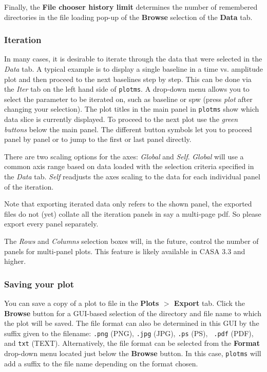 Finally, the {\bf File chooser history limit} determines the number of
remembered directories in the file loading pop-up of the {\bf Browse}
selection of the {\bf Data} tab.


\subsubsection{Iteration}
\label{section:edit.plot.plotms.iter}

In many cases, it is desirable to iterate through the data that were
selected in the {\it Data} tab. A typical example is to display a
single baseline in a time vs. amplitude plot and then proceed to the
next baselines step by step. This can be done via the {\it Iter} tab
on the left hand side of {\tt plotms}. A drop-down menu allows you to
select the parameter to be iterated on, such as baseline or spw (press
{\it plot} after changing your selection). The plot titles in the main
panel in {\tt plotms} show which data slice is currently displayed. To
proceed to the next plot use the {\it green buttons} below the main
panel. The different button symbols let you to proceed panel by panel
or to jump to the first or last panel directly.
 

There are two scaling options for the axes: {\it Global} and {\it
  Self}. {\it Global} will use a common axis range based on data
loaded with the selection criteria specified in the {\it Data}
tab. {\it Self} readjusts the axes scaling to the data for each
individual panel of the iteration. 


Note that exporting iterated data only refers to the shown panel, the
exported files do not (yet) collate all the iteration panels in say a
multi-page pdf. So please export every panel separately.

The {\it Rows} and {\it Columns} selection boxes will, in the future,
control the number of panels for multi-panel plots. This feature is
likely available in CASA 3.3 and higher.



\subsubsection{Saving your plot}
\label{section:edit.plot.plotms.save}

You can save a copy of a plot to file in the {\bf Plots $>$ Export}
tab. Click the {\bf Browse} button for a GUI-based selection of the
directory and file name to which the plot will be saved. The file
format can also be determined in this GUI by the suffix given to the
filename: {\tt .png} (PNG), {\tt .jpg} (JPG), {\tt .ps} (PS), {\tt
  .pdf} (PDF), and {\tt txt} (TEXT). Alternatively, the file format can
be selected from the {\bf Format} drop-down menu located just below
the {\bf Browse} button. In this case, {\tt plotms} will add a suffix
to the file name depending on the format chosen.

